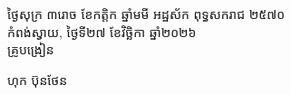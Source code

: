 \documentclass[a4paper,10pt]{article}
\begin{document}
\vspace{6pt}
\hfill
\begin{minipage}{10.5cm}
  {\centering
    ថ្ងៃសុក្រ ៣រោច ខែកត្តិក ឆ្នាំមមី អដ្ឋស័ក ពុទ្ធសករាជ ២៥៧០\\[2pt]
    កំពង់ស្វាយ, ថ្ងៃទី២៧ ខែវិច្ឆិកា ឆ្នាំ២០២៦\\[3pt]
    {\muol គ្រូបង្រៀន}\par}
  \vspace{28pt}
  \hfill{\muol ហុក ប៊ុនថែន}\hspace*{1.4cm}
\end{minipage}
\end{document}
